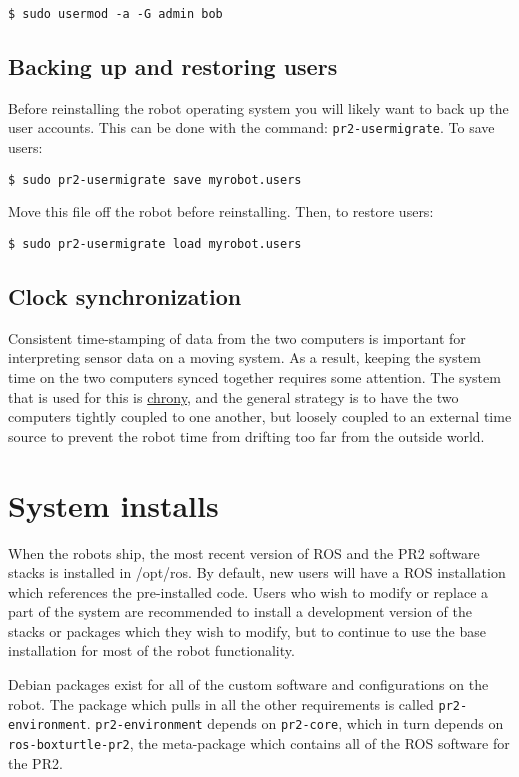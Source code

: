 \begin{verbatim}
$ sudo usermod -a -G admin bob
\end{verbatim}

\subsection{Backing up and restoring users}
Before reinstalling the robot operating system you will likely want to
back up the user accounts. This can be done with the command:
\texttt{pr2-usermigrate}. To save users:
\begin{verbatim}
$ sudo pr2-usermigrate save myrobot.users
\end{verbatim}

Move this file off the robot before reinstalling.  Then, to restore users:
\begin{verbatim}
$ sudo pr2-usermigrate load myrobot.users
\end{verbatim}


\subsection{Clock synchronization}
Consistent time-stamping of data from the two computers is important
for interpreting sensor data on a moving system.  As a result, keeping
the system time on the two computers synced together requires some
attention.  The system that is used for this is
\href{http://chrony.tuxfamily.org/}{chrony}, and the general strategy
is to have the two computers tightly coupled to one another, but
loosely coupled to an external time source to prevent the robot time
from drifting too far from the outside world.

\section{System installs}
When the robots ship, the most recent version of ROS and the PR2
software stacks is installed in /opt/ros.  By default, new users will
have a ROS installation which references the pre-installed code.
Users who wish to modify or replace a part of the system are
recommended to install a development version of the stacks or packages
which they wish to modify, but to continue to use the base
installation for most of the robot functionality.

Debian packages exist for all of the custom software and
configurations on the robot.  The package which pulls in all the other
requirements is called \texttt{pr2-environment}.
\texttt{pr2-environment} depends on \texttt{pr2-core}, which in turn
depends on \texttt{ros-boxturtle-pr2}, the meta-package which contains
all of the ROS software for the PR2.

